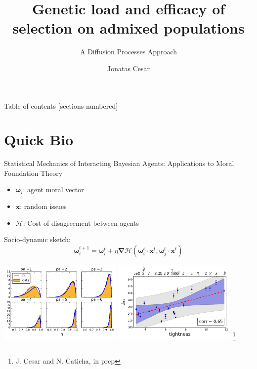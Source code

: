 \documentclass[10pt]{beamer}
\title{Genetic load and efficacy of selection on admixed populations}
\subtitle{A Diffusion Processes Approach}
\date{}
\author{Jonatas Cesar}
\institute{University of S\~ao Paulo \& University of Chicago}
\begin{document}
\maketitle

\begin{frame}{Table of contents}
  [sections numbered]
  \tableofcontents[hideallsubsections]
\end{frame}

\section{Quick Bio}

\begin{frame}{Statistical Mechanics of Interacting Bayesian Agents: Applications
    to Moral Foundation Theory}
  \begin{itemize}
      \item $\bm \omega_i$: agent moral vector 
      \item $\bm x$: random issues 
      \item $\mathcal H$: Cost of disagreement between agents
  \end{itemize}
  
  Socio-dynamic sketch:
  \[
    \bm \omega_i^{t + 1} = \bm \omega_i^{t} + 
    \eta \bm \nabla 
    \mathcal H (\bm \omega_i^t \cdot \bm x ^t, \bm \omega_j^t \cdot \bm x ^t)
  \]

  \includegraphics[width=0.45\textwidth]{./Figures/mf_usa}
  \hspace{5pt}
  \includegraphics[width=0.45\textwidth]{./Figures/beta_tight.pdf}
  \let\thefootnote\relax\footnote{J. Cesar and N. Caticha, in prep}
\end{frame}
\end{document}

